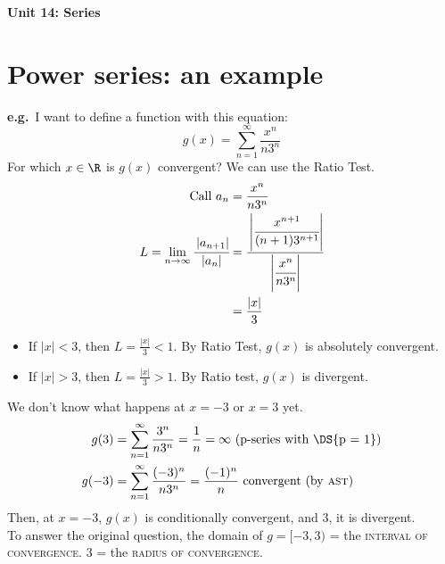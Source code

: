 
\usepackage{blindtext}
\setcounter{tocdepth}{4}
\setcounter{secnumdepth}{4}


\usepackage{subfiles}

\sectionfont{\color{blue}\selectfont}
\subsectionfont{\color{green}\selectfont}

\newcommand{\eg}{\textbf{e.g.}~}
\newcommand{\abs}[1]{\left\lvert #1 \right\rvert}
\newcommand\Ccancel[2][black]{\renewcommand\CancelColor{\color{#1}}\cancel{#2}}




\newtheorem{theorem}{Theorem}[section]
\newtheorem*{theorem*}{Theorem}
\newtheorem{definition}{Definition}[section]
{\LARGE \textbf{Unit 14: Series}}
\thispagestyle{empty}
\tableofcontents
\newpage
\clearpage
\setcounter{page}{1}
\section{Power series: an example}
\eg I want to define a function with this equation: \[g(x) = \sum_{n = 1}^{\infty} \frac{x^n}{n3^n}\]
For which \(x \in \R\) is \(g(x)\) convergent? We can use the Ratio Test.
\begin{align*}
    \text{Call } a_n                                       & = \frac{x^n}{n3^n}                                                      \\
    L = \lim_{n\to\infty} \cfrac{\abs{a_{n+1}}}{\abs{a_n}} & = \cfrac{\abs{\cfrac{x^{n+1}}{(n+1) 3^{n+1}}}}{\abs{\cfrac{x^n}{n3^n}}} \\
                                                           & = \frac{\abs{x}}{3}
\end{align*}
\begin{itemize}
    \item If \(\abs{x} < 3\), then \(L = \frac{\abs{x}}{3} < 1\). By Ratio Test, \(g(x)\) is absolutely convergent.
    \item If \(\abs{x} > 3\), then \(L = \frac{\abs{x}}{3} > 1\). By Ratio test, \(g(x)\) is divergent.
\end{itemize}
We don't know what happens at \(x = -3\) or \(x = 3\) yet. \\
\begin{align*}
    g(3)  & = \sum_{n = 1}^{\infty} \frac{3^n}{n3^n} = \frac{1}{n}  = \infty \text{ (p-series with \DS{p = 1})} \\
    g(-3) & = \sum_{n = 1}^{\infty} \frac{(-3)^n}{n3^n} = \frac{(-1)^n}{n} \text{ convergent (by \textsc{ast})} \\
\end{align*}
Then, at \(x = -3\), \(g(x)\) is conditionally convergent, and \(3\), it is divergent. \\
To answer the original question, the domain of \(g = [-3, 3)\) = the \textsc{interval of convergence}. \(3\) = the \textsc{radius of convergence}.
\newpage



